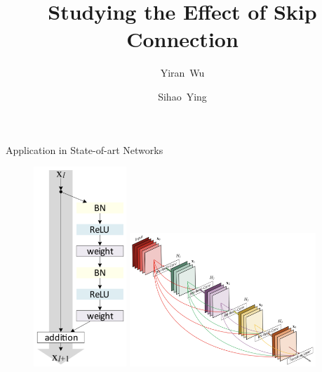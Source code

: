 \documentclass{beamer}
\title[Block Partitioning and Perfect Phylogenies] 
{%
Studying the Effect of Skip Connection%
}
\author[Gramm, Hartman, Nierhoff, Sharan, Tantau]
{
  Yiran~Wu \and
  Sihao~Ying
}
\begin{document}
\begin{frame}
  \titlepage
\end{frame}


\section{}

\begin{frame}
	\begin{block}{Application in State-of-art Networks}
		\begin{figure}[htbp]
		\centering
		\includegraphics[width = 3.5cm] {resnet.png} \text{\ } 
		\includegraphics[width = 7cm] {densenet.png} 
		\end{figure} 
	\end{block}
\end{frame}
\end{document}
